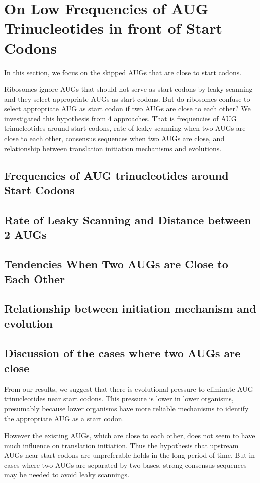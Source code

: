 



\section{On Low Frequencies of AUG Trinucleotides in front of Start Codons}
In this section, we focus on the skipped AUGs that are close to start
codons.

Ribosomes ignore AUGs that should not serve as start codons by leaky 
scanning and they select appropriate AUGs as start codons. But do
ribosomes confuse to select appropriate AUG as start codon if two AUGs
are close to each other? We investigated this hypothesis from
4 approaches. That is frequencies of AUG trinucleotides around start codons,
rate of leaky scanning when two AUGs are close to each other,
consensus sequences when two AUGs are close, and relationship between
translation initiation mechanisms and evolutions.


\subsection{Frequencies of AUG trinucleotides around Start Codons}
 


\subsection{Rate of Leaky Scanning and Distance between 2 AUGs}



\subsection{Tendencies When Two AUGs are Close to Each Other}




\subsection{Relationship between initiation mechanism and evolution}



\subsection{Discussion of the cases where two AUGs are close}

From our results, we suggest that there is evolutional pressure to 
eliminate AUG trinucleotides near start codons. This pressure is 
lower in lower organisms, presumably because lower organisms have
more reliable mechanisms to identify the appropriate AUG as a start codon.

However the existing AUGs, which are close to each other, does not
seem to have much influence on translation initiation. Thus the
hypothesis that upstream AUGs near start codons are
unpreferable holds in the long period of time. But in cases where two
AUGs are separated by two bases, strong consensus sequences may be 
needed to avoid leaky scannings.


